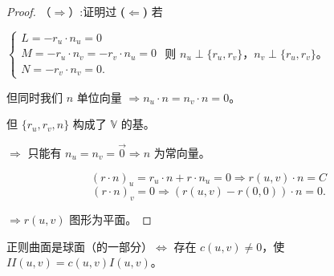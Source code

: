 \documentclass[lang=cn,10pt,thmcnt=section]{elegantbook}
\begin{document}
\begin{proof}
    （$\Rightarrow$）:证明过
    \textbf{($\Leftarrow$)} 若

$\begin{cases}
L = -r_u \cdot n_u = 0 \\
M = -r_u \cdot n_v = -r_v \cdot n_u = 0 \\
N = -r_v \cdot n_v = 0.
\end{cases}$
则 $n_u \perp \{r_u, r_v\}$，$n_v \perp \{r_u, r_v\}$。

但同时我们 $n$ 单位向量 $\Rightarrow n_u \cdot n = n_v \cdot n = 0$。

但 $\{r_u, r_v, n\}$ 构成了 $\mathbb{V}$ 的基。

$\Rightarrow$ 只能有 $n_u = n_v = \vec{0} \Rightarrow n$ 为常向量。

$$
(r \cdot n)_u = r_u \cdot n + r \cdot n_u = 0 \Rightarrow r(u,v) \cdot n = C
$$
$$
(r \cdot n)_v = 0 \Rightarrow (r(u,v) - r(0,0)) \cdot n = 0.
$$

$\Rightarrow r(u,v)$ 图形为平面。

\end{proof}
\begin{proposition}
    正则曲面是球面（的一部分）$\Leftrightarrow$ 存在 $c(u,v) \neq 0$，使 $II(u,v) = c(u,v)I(u,v)$。
\end{proposition}
\end{document}
